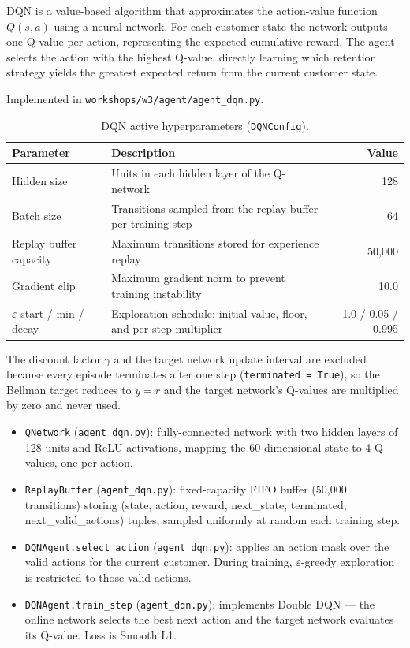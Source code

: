 \documentclass{article}
\begin{document}
DQN is a value-based algorithm that approximates the action-value function $Q(s, a)$
using a neural network. For each customer state the network outputs one Q-value per
action, representing the expected cumulative reward. The agent selects the action with
the highest Q-value, directly learning which retention strategy yields the greatest
expected return from the current customer state.

Implemented in \texttt{workshops/w3/agent/agent\_dqn.py}.

\begin{table}[H]
\centering
\caption{DQN active hyperparameters (\texttt{DQNConfig}).}
\begin{tabular}{lp{7.5cm}r}
\toprule
\textbf{Parameter} & \textbf{Description} & \textbf{Value} \\
\midrule
Hidden size               & Units in each hidden layer of the Q-network & 128 \\
Batch size                & Transitions sampled from the replay buffer per training step & 64 \\
Replay buffer capacity    & Maximum transitions stored for experience replay & 50{,}000 \\
Gradient clip             & Maximum gradient norm to prevent training instability & 10.0 \\
$\varepsilon$ start / min / decay & Exploration schedule: initial value, floor, and per-step multiplier & 1.0 / 0.05 / 0.995 \\
\bottomrule
\end{tabular}
\end{table}

The discount factor $\gamma$ and the target network update interval are excluded because
every episode terminates after one step (\texttt{terminated = True}), so the Bellman target
reduces to $y = r$ and the target network's Q-values are multiplied by zero and never used.

\begin{itemize}

\item \texttt{QNetwork} (\texttt{agent\_dqn.py}):
fully-connected network with two hidden layers of 128 units and ReLU activations,
mapping the 60-dimensional state to 4 Q-values, one per action.

\item \texttt{ReplayBuffer} (\texttt{agent\_dqn.py}):
fixed-capacity FIFO buffer (50{,}000 transitions) storing
(state, action, reward, next\_state, terminated, next\_valid\_actions) tuples,
sampled uniformly at random each training step.

\item \texttt{DQNAgent.select\_action} (\texttt{agent\_dqn.py}):
applies an action mask over the valid actions for the current customer.
During training, $\varepsilon$-greedy exploration is restricted to those valid actions.

\item \texttt{DQNAgent.train\_step} (\texttt{agent\_dqn.py}):
implements Double DQN — the online network selects the best next action and the target
network evaluates its Q-value. Loss is Smooth L1.

\end{itemize}
\end{document}

